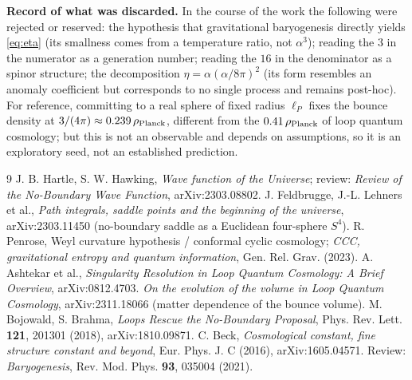 \documentclass[11pt,a4paper]{article}
\newcommand{\eP}{\ell_P}
\begin{document}
\textbf{Record of what was discarded.} In the course of the work the following were rejected or reserved: the hypothesis that gravitational baryogenesis directly yields \eqref{eq:eta} (its smallness comes from a temperature ratio, not $\alpha^3$); reading the $3$ in the numerator as a generation number; reading the $16$ in the denominator as a spinor structure; the decomposition $\eta=\alpha(\alpha/8\pi)^2$ (its form resembles an anomaly coefficient but corresponds to no single process and remains post-hoc). For reference, committing to a real sphere of fixed radius $\eP$ fixes the bounce density at $3/(4\pi)\approx0.239\,\rho_{\rm Planck}$, different from the $0.41\,\rho_{\rm Planck}$ of loop quantum cosmology; but this is not an observable and depends on assumptions, so it is an exploratory seed, not an established prediction.

\begin{thebibliography}{9}\small
{} J. B. Hartle, S. W. Hawking, \textit{Wave function of the Universe}; review: \textit{Review of the No-Boundary Wave Function}, arXiv:2303.08802.
 J. Feldbrugge, J.-L. Lehners et al., \textit{Path integrals, saddle points and the beginning of the universe}, arXiv:2303.11450 (no-boundary saddle as a Euclidean four-sphere $S^4$).
 R. Penrose, Weyl curvature hypothesis / conformal cyclic cosmology; \textit{CCC, gravitational entropy and quantum information}, Gen. Rel. Grav. (2023).
 A. Ashtekar et al., \textit{Singularity Resolution in Loop Quantum Cosmology: A Brief Overview}, arXiv:0812.4703.
 \textit{On the evolution of the volume in Loop Quantum Cosmology}, arXiv:2311.18066 (matter dependence of the bounce volume).
 M. Bojowald, S. Brahma, \textit{Loops Rescue the No-Boundary Proposal}, Phys. Rev. Lett. \textbf{121}, 201301 (2018), arXiv:1810.09871.
 C. Beck, \textit{Cosmological constant, fine structure constant and beyond}, Eur. Phys. J. C (2016), arXiv:1605.04571.
 Review: \textit{Baryogenesis}, Rev. Mod. Phys. \textbf{93}, 035004 (2021).
\end{thebibliography}
\end{document}
